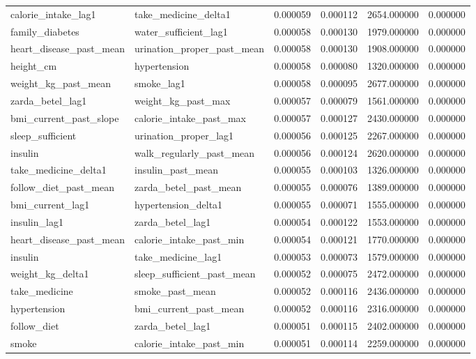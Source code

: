 \begin{longtable}{llrrrr}
calorie\_intake\_lag1 & take\_medicine\_delta1 & 0.000059 & 0.000112 & 2654.000000 & 0.000000 \\
family\_diabetes & water\_sufficient\_lag1 & 0.000058 & 0.000130 & 1979.000000 & 0.000000 \\
heart\_disease\_past\_mean & urination\_proper\_past\_mean & 0.000058 & 0.000130 & 1908.000000 & 0.000000 \\
height\_cm & hypertension & 0.000058 & 0.000080 & 1320.000000 & 0.000000 \\
weight\_kg\_past\_mean & smoke\_lag1 & 0.000058 & 0.000095 & 2677.000000 & 0.000000 \\
zarda\_betel\_lag1 & weight\_kg\_past\_max & 0.000057 & 0.000079 & 1561.000000 & 0.000000 \\
bmi\_current\_past\_slope & calorie\_intake\_past\_max & 0.000057 & 0.000127 & 2430.000000 & 0.000000 \\
sleep\_sufficient & urination\_proper\_lag1 & 0.000056 & 0.000125 & 2267.000000 & 0.000000 \\
insulin & walk\_regularly\_past\_mean & 0.000056 & 0.000124 & 2620.000000 & 0.000000 \\
take\_medicine\_delta1 & insulin\_past\_mean & 0.000055 & 0.000103 & 1326.000000 & 0.000000 \\
follow\_diet\_past\_mean & zarda\_betel\_past\_mean & 0.000055 & 0.000076 & 1389.000000 & 0.000000 \\
bmi\_current\_lag1 & hypertension\_delta1 & 0.000055 & 0.000071 & 1555.000000 & 0.000000 \\
insulin\_lag1 & zarda\_betel\_lag1 & 0.000054 & 0.000122 & 1553.000000 & 0.000000 \\
heart\_disease\_past\_mean & calorie\_intake\_past\_min & 0.000054 & 0.000121 & 1770.000000 & 0.000000 \\
insulin & take\_medicine\_lag1 & 0.000053 & 0.000073 & 1579.000000 & 0.000000 \\
weight\_kg\_delta1 & sleep\_sufficient\_past\_mean & 0.000052 & 0.000075 & 2472.000000 & 0.000000 \\
take\_medicine & smoke\_past\_mean & 0.000052 & 0.000116 & 2436.000000 & 0.000000 \\
hypertension & bmi\_current\_past\_mean & 0.000052 & 0.000116 & 2316.000000 & 0.000000 \\
follow\_diet & zarda\_betel\_lag1 & 0.000051 & 0.000115 & 2402.000000 & 0.000000 \\
smoke & calorie\_intake\_past\_min & 0.000051 & 0.000114 & 2259.000000 & 0.000000 \\

\end{longtable}
